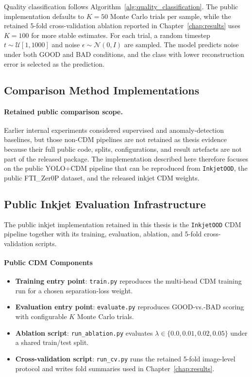 Quality classification follows Algorithm~\ref{alg:quality_classification}. The public implementation defaults to $K = 50$ Monte Carlo trials per sample, while the retained 5-fold cross-validation ablation reported in Chapter~\ref{chap:results} uses $K = 100$ for more stable estimates. For each trial, a random timestep $t \sim \mathcal{U}[1, 1000]$ and noise $\epsilon \sim \mathcal{N}(0, I)$ are sampled. The model predicts noise under both GOOD and BAD conditions, and the class with lower reconstruction error is selected as the prediction.

\subsection{Comparison Method Implementations}
\label{sec:impl:inkjet:comparisons}

\paragraph{Retained public comparison scope.}
Earlier internal experiments considered supervised and anomaly-detection baselines, but those non-CDM pipelines are not retained as thesis evidence because their full public code, splits, configurations, and result artefacts are not part of the released package. The implementation described here therefore focuses on the public YOLO+CDM pipeline that can be reproduced from \texttt{InkjetOOD}, the public FTI\_Zer0P dataset, and the released inkjet CDM weights.


\subsection{Public Inkjet Evaluation Infrastructure}
\label{sec:impl:comparison_methods}

The public inkjet implementation retained in this thesis is the
\texttt{InkjetOOD} CDM pipeline together with its training, evaluation,
ablation, and 5-fold cross-validation scripts.

\paragraph{Public CDM Components}
\begin{itemize}
\item \textbf{Training entry point}: \texttt{train.py} reproduces the multi-head CDM training run for a chosen separation-loss weight.
\item \textbf{Evaluation entry point}: \texttt{evaluate.py} reproduces GOOD-vs.-BAD scoring with configurable $K$ Monte Carlo trials.
\item \textbf{Ablation script}: \texttt{run\_ablation.py} evaluates $\lambda \in \{0.0, 0.01, 0.02, 0.05\}$ under a shared train/test split.
\item \textbf{Cross-validation script}: \texttt{run\_cv.py} runs the retained 5-fold image-level protocol and writes fold summaries used in Chapter~\ref{chap:results}.
\end{itemize}

